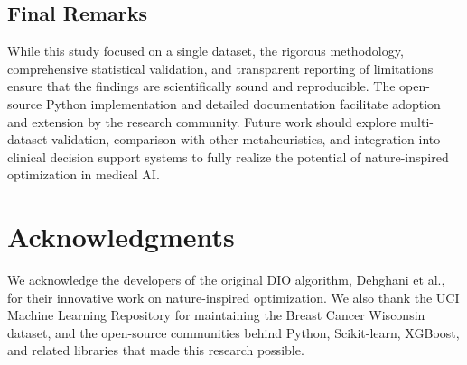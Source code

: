 \documentclass[12pt, a4paper]{article}
\begin{document}
\subsection{Final Remarks}
While this study focused on a single dataset, the rigorous methodology, comprehensive statistical validation, and transparent reporting of limitations ensure that the findings are scientifically sound and reproducible. The open-source Python implementation and detailed documentation facilitate adoption and extension by the research community. Future work should explore multi-dataset validation, comparison with other metaheuristics, and integration into clinical decision support systems to fully realize the potential of nature-inspired optimization in medical AI.

\section*{Acknowledgments}
We acknowledge the developers of the original DIO algorithm, Dehghani et al., for their innovative work on nature-inspired optimization. We also thank the UCI Machine Learning Repository for maintaining the Breast Cancer Wisconsin dataset, and the open-source communities behind Python, Scikit-learn, XGBoost, and related libraries that made this research possible.

\end{document}
